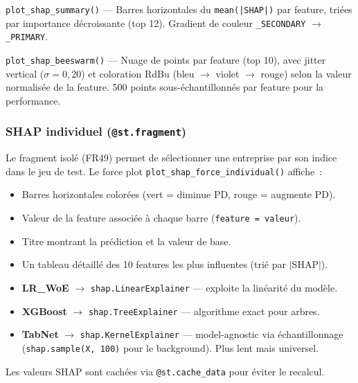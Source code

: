 \documentclass[12pt,a4paper]{article}
\begin{document}
\begin{description}[leftmargin=1em]
    \item[Bar chart importance] \texttt{plot\_shap\_summary()} --- Barres horizontales du \texttt{mean(|SHAP|)} par feature, tri\'ees par importance d\'ecroissante (top 12). Gradient de couleur \texttt{\_SECONDARY} $\to$ \texttt{\_PRIMARY}.
    \item[Beeswarm] \texttt{plot\_shap\_beeswarm()} --- Nuage de points par feature (top 10), avec jitter vertical ($\sigma = 0{,}20$) et coloration RdBu (bleu $\to$ violet $\to$ rouge) selon la valeur normalis\'ee de la feature. 500 points sous-\'echantillonn\'es par feature pour la performance.
\end{description}

\subsubsection{SHAP individuel (\texttt{@st.fragment})}

Le fragment isol\'e (FR49) permet de s\'electionner une entreprise par son indice dans le jeu de test. Le force plot \texttt{plot\_shap\_force\_individual()} affiche~:
\begin{itemize}[leftmargin=2em]
    \item Barres horizontales color\'ees (vert = diminue PD, rouge = augmente PD).
    \item Valeur de la feature associ\'ee \`a chaque barre (\texttt{feature = valeur}).
    \item Titre montrant la pr\'ediction et la valeur de base.
    \item Un tableau d\'etaill\'e des 10 features les plus influentes (tri\'e par $|$SHAP$|$).
\end{itemize}

\begin{warningbox}
\begin{itemize}[leftmargin=1em]
    \item \textbf{LR\_WoE} $\to$ \texttt{shap.LinearExplainer} --- exploite la lin\'earit\'e du mod\`ele.
    \item \textbf{XGBoost} $\to$ \texttt{shap.TreeExplainer} --- algorithme exact pour arbres.
    \item \textbf{TabNet} $\to$ \texttt{shap.KernelExplainer} --- model-agnostic via \'echantillonnage (\texttt{shap.sample(X, 100)} pour le background). Plus lent mais universel.
\end{itemize}
Les valeurs SHAP sont cach\'ees via \texttt{@st.cache\_data} pour \'eviter le recalcul.
\end{warningbox}
\end{document}
